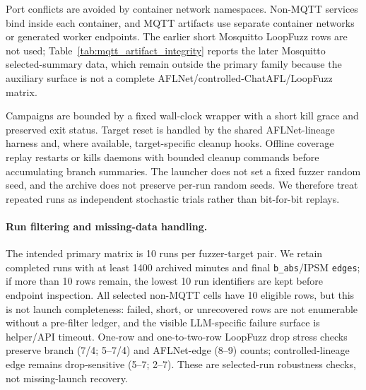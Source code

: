 \documentclass[final,5p,times,number]{elsarticle}
\begin{document}
Port conflicts are avoided by container network namespaces. Non-MQTT services bind inside each container, and MQTT artifacts use separate container networks or generated worker endpoints. The earlier short Mosquitto LoopFuzz rows are not used; Table~\ref{tab:mqtt_artifact_integrity} reports the later Mosquitto selected-summary data, which remain outside the primary family because the auxiliary surface is not a complete AFLNet/controlled-ChatAFL/LoopFuzz matrix.

Campaigns are bounded by a fixed wall-clock wrapper with a short kill grace and preserved exit status. Target reset is handled by the shared AFLNet-lineage harness and, where available, target-specific cleanup hooks. Offline coverage replay restarts or kills daemons with bounded cleanup commands before accumulating branch summaries. The launcher does not set a fixed fuzzer random seed, and the archive does not preserve per-run random seeds. We therefore treat repeated runs as independent stochastic trials rather than bit-for-bit replays.

\paragraph{Run filtering and missing-data handling.}
The intended primary matrix is 10 runs per fuzzer-target pair. We retain completed runs with at least 1400 archived minutes and final \texttt{b\_abs}/IPSM \texttt{edges}; if more than 10 rows remain, the lowest 10 run identifiers are kept before endpoint inspection. All selected non-MQTT cells have 10 eligible rows, but this is not launch completeness: failed, short, or unrecovered rows are not enumerable without a pre-filter ledger, and the visible LLM-specific failure surface is helper/API timeout. One-row and one-to-two-row LoopFuzz drop stress checks preserve branch (7/4; 5--7/4) and AFLNet-edge (8--9) counts; controlled-lineage edge remains drop-sensitive (5--7; 2--7). These are selected-run robustness checks, not missing-launch recovery.
\end{document}
